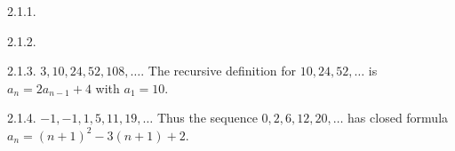  \protect {} \protect \begin {itemize} 
\begin{ans}{2.1.1.}
	
\end{ans}
\begin{ans}{2.1.2.}
	
\end{ans}
\begin{ans}{2.1.3.}
		$3, 10, 24, 52, 108,\ldots$.  The recursive definition for $10, 24, 52, \ldots$ is $a_n = 2a_{n-1} + 4$ with $a_1 = 10$.
	
\end{ans}
\begin{ans}{2.1.4.}
		$-1, -1, 1, 5, 11, 19,\ldots$  Thus the sequence $0, 2, 6, 12, 20,\ldots$ has closed formula $a_n = (n+1)^2 - 3(n+1) + 2$.
	
\end{ans}
\protect \end {itemize}
